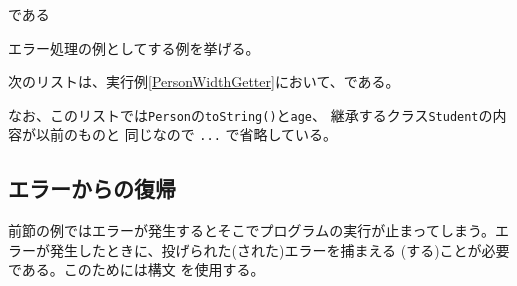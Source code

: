 \begin{frame}[containsverbatim]
である%

エラー処理の例としてする例を挙げる。
 \begin{Exec}\upshape\label{throwError}
	次のリストは、実行例\ref{PersonWidthGetter}において、である。

	なお、このリストでは\texttt{Person}の\texttt{toString()}と\texttt{age}、
	継承するクラス\texttt{Student}の内容が以前のものと
	同じなので \texttt{...} で省略している。
 \end{Exec}


\subsection{エラーからの復帰}
前節の例ではエラーが発生するとそこでプログラムの実行が止まってしまう。エ
ラーが発生したときに、投げられた(された)エラーを捕まえる
(する)ことが必要である。このためには構文
を使用する。


\end{frame}
